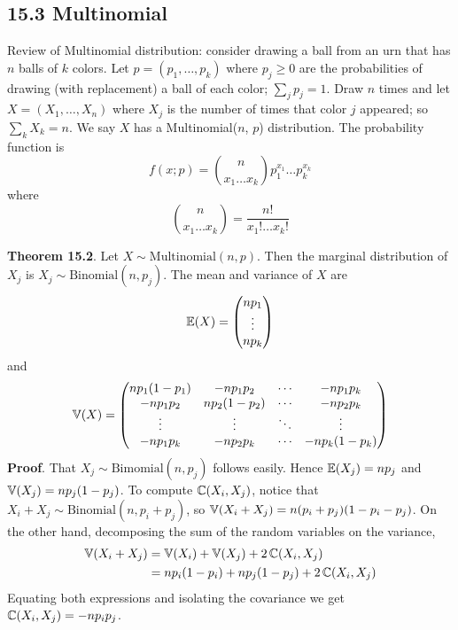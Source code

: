 \subsection*{15.3 Multinomial}\label{multinomial}
Review of Multinomial distribution: consider drawing a ball from an urn
that has \(n\) balls of \(k\) colors. Let \(p = (p_{1}, \dots, p_{k})\)
where \(p_{j} \geq 0\) are the probabilities of drawing (with replacement)
a ball of each color; \(\sum_{j} p_{j} = 1\). Draw \(n\) times and let
\(X = (X_{1}, \dots, X_{n})\) where \(X_{j}\) is the number of times that
color \(j\) appeared; so \(\sum_{k} X_{k} = n\). We say \(X\) has a
Multinomial(\(n\), \(p\)) distribution. The probability function is
\[
f(x; p) = \binom{n}{x_{1} \dots x_{k}} p_{1}^{x_{1}}\dots p_{k}^{x_{k}}
\]
where
\[
\binom{n}{x_{1} \dots x_{k}} = \frac{n!}{x_{1}! \dots x_{k}!}
\]

\textbf{Theorem 15.2}. Let \(X \sim \text{Multinomial}(n, p)\). Then the
marginal distribution of \(X_{j}\) is
\(X_{j} \sim \text{Binomial}(n, p_{j})\). The mean and variance of \(X\) are
\[
\operatorname{\mathbb{E}}(X) = \begin{pmatrix} np_{1} \\ \vdots \\ np_{k} \end{pmatrix}
\]
and
\[
\operatorname{\mathbb{V}}(X) = \begin{pmatrix}
np_{1}(1 - p_{1}) & -np_{1}p_{2} & \cdots & -np_{1}p_{k} \\
-np_{1}p_{2} & np_{2}(1 - p_{2}) & \cdots & -np_{2}p_{k} \\
\vdots & \vdots & \ddots & \vdots \\
-np_{1}p_{k} & -np_{2}p_{k} & \cdots & -np_{k}(1 - p_{k})
\end{pmatrix}
\]
\textbf{Proof}. That \(X_{j} \sim \text{Bimomial}(n, p_{j})\) follows
easily. Hence \(\operatorname{\mathbb{E}}(X_{j}) = np_{j}\) and
\(\operatorname{\mathbb{V}}(X_{j}) = np_{j}(1 - p_{j})\).
To compute \(\operatorname{\mathbb{C}}(X_{i}, X_{j})\), notice that
\(X_{i} + X_{j} \sim \text{Binomial}(n, p_{i} + p_{j})\), so
\(\operatorname{\mathbb{V}}(X_{i} + X_{j}) = n (p_{i} + p_{j}) (1 - p_{i} - p_{j})\). On the other
hand, decomposing the sum of the random variables on the variance,
\begin{align*}
\operatorname{\mathbb{V}}(X_{i} + X_{j}) &= \operatorname{\mathbb{V}}(X_{i}) + \operatorname{\mathbb{V}}(X_{j}) + 2 \operatorname{\mathbb{C}}(X_{i}, X_{j}) \\
&= np_{i}(1 - p_{i}) + np_{j}(1 - p_{j}) + 2 \operatorname{\mathbb{C}}(X_{i}, X_{j})
\end{align*}
Equating both expressions and isolating the covariance we get
\(\operatorname{\mathbb{C}}(X_{i}, X_{j}) = -np_{i}p_{j}\).

